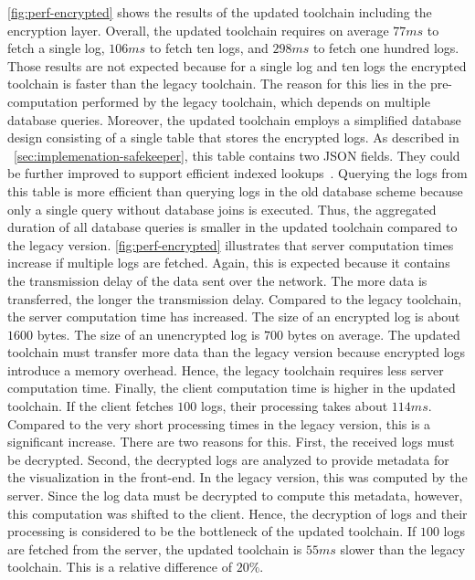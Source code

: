 \documentclass[../main.tex]{subfiles}
\begin{document}
\cref{fig:perf-encrypted} shows the results of the updated toolchain including the encryption layer.
Overall, the updated toolchain requires on average $77ms$ to fetch a single log, $106ms$ to fetch ten logs, and $298ms$ to fetch one hundred logs.
Those results are not expected because for a single log and ten logs the encrypted toolchain is faster than the legacy toolchain.
The reason for this lies in the pre-computation performed by the legacy toolchain, which depends on multiple database queries.
Moreover, the updated toolchain employs a simplified database design consisting of a single table that stores the encrypted logs.
As described in ~\cref{sec:implemenation-safekeeper}, this table contains two JSON fields.
They could be further improved to support efficient indexed lookups~\cite{Shang2021}.
Querying the logs from this table is more efficient than querying logs in the old database scheme because only a single query without database joins is executed.
Thus, the aggregated duration of all database queries is smaller in the updated toolchain compared to the legacy version.
\cref{fig:perf-encrypted} illustrates that server computation times increase if multiple logs are fetched.
Again, this is expected because it contains the transmission delay of the data sent over the network.
The more data is transferred, the longer the transmission delay.
Compared to the legacy toolchain, the server computation time has increased.
The size of an encrypted log is about $1600$ bytes.
The size of an unencrypted log is $700$ bytes on average.
The updated toolchain must transfer more data than the legacy version because encrypted logs introduce a memory overhead.
Hence, the legacy toolchain requires less server computation time.
Finally, the client computation time is higher in the updated toolchain.
If the client fetches $100$ logs, their processing takes about $114ms$.
Compared to the very short processing times in the legacy version, this is a significant increase.
There are two reasons for this.
First, the received logs must be decrypted.
Second, the decrypted logs are analyzed to provide metadata for the visualization in the front-end.
In the legacy version, this was computed by the server.
Since the log data must be decrypted to compute this metadata, however, this computation was shifted to the client.
Hence, the decryption of logs and their processing is considered to be the bottleneck of the updated toolchain.
If $100$ logs are fetched from the server, the updated toolchain is $55ms$ slower than the legacy toolchain.
This is a relative difference of $20\%$.
\end{document}
